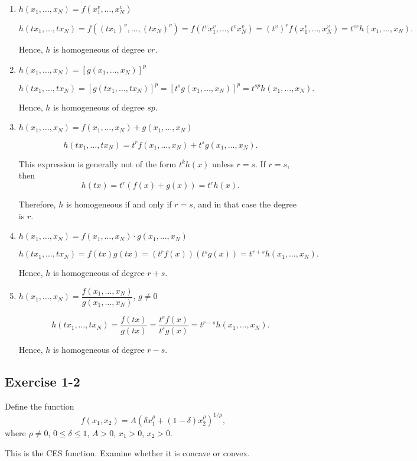 \begin{enumerate}
    \item[(i)] $h(x_1,\dots,x_N)=f(x_1^v,\dots,x_N^v)$

    \[
    h(tx_1,\dots,tx_N)
    = f((tx_1)^v,\dots,(tx_N)^v)
    = f(t^v x_1^v,\dots,t^v x_N^v)
    = (t^v)^r f(x_1^v,\dots,x_N^v)
    = t^{vr} h(x_1,\dots,x_N).
    \]

    Hence, $h$ is homogeneous of degree $\boxed{vr}$.

    \item[(ii)] $h(x_1,\dots,x_N)=[g(x_1,\dots,x_N)]^p$

    \[
    h(tx_1,\dots,tx_N)
    = [g(tx_1,\dots,tx_N)]^p
    = [t^s g(x_1,\dots,x_N)]^p
    = t^{sp} h(x_1,\dots,x_N).
    \]

    Hence, $h$ is homogeneous of degree $\boxed{sp}$.

    \item[(iii)] $h(x_1,\dots,x_N)=f(x_1,\dots,x_N)+g(x_1,\dots,x_N)$

    \[
    h(tx_1,\dots,tx_N)
    = t^r f(x_1,\dots,x_N) + t^s g(x_1,\dots,x_N).
    \]

    This expression is generally not of the form $t^k h(x)$ unless $r=s$.  
    If $r=s$, then
    \[
    h(tx)=t^r(f(x)+g(x))=t^r h(x).
    \]

    Therefore, $h$ is homogeneous if and only if $r=s$, and in that case the degree is $\boxed{r}$.

    \item[(iv)] $h(x_1,\dots,x_N)=f(x_1,\dots,x_N)\cdot g(x_1,\dots,x_N)$

    \[
    h(tx_1,\dots,tx_N)
    = f(tx)g(tx)
    = (t^r f(x))(t^s g(x))
    = t^{r+s} h(x_1,\dots,x_N).
    \]

    Hence, $h$ is homogeneous of degree $\boxed{r+s}$.

    \item[(v)] $h(x_1,\dots,x_N)=\dfrac{f(x_1,\dots,x_N)}{g(x_1,\dots,x_N)}$, $g\neq 0$

    \[
    h(tx_1,\dots,tx_N)
    = \frac{f(tx)}{g(tx)}
    = \frac{t^r f(x)}{t^s g(x)}
    = t^{r-s} h(x_1,\dots,x_N).
    \]

    Hence, $h$ is homogeneous of degree $\boxed{r-s}$.
\end{enumerate}




\vspace{30pt}
\begin{tcolorbox}[breakable]
\subsection*{Exercise 1-2}

Define the function
\[
f(x_1,x_2) = A\left(\delta x_1^{\rho} + (1-\delta)x_2^{\rho}\right)^{1/\rho},
\]
where $\rho \neq 0$, $0 \le \delta \le 1$, $A>0$, $x_1>0$, $x_2>0$.

This is the CES function. Examine whether it is concave or convex.

\end{tcolorbox}

